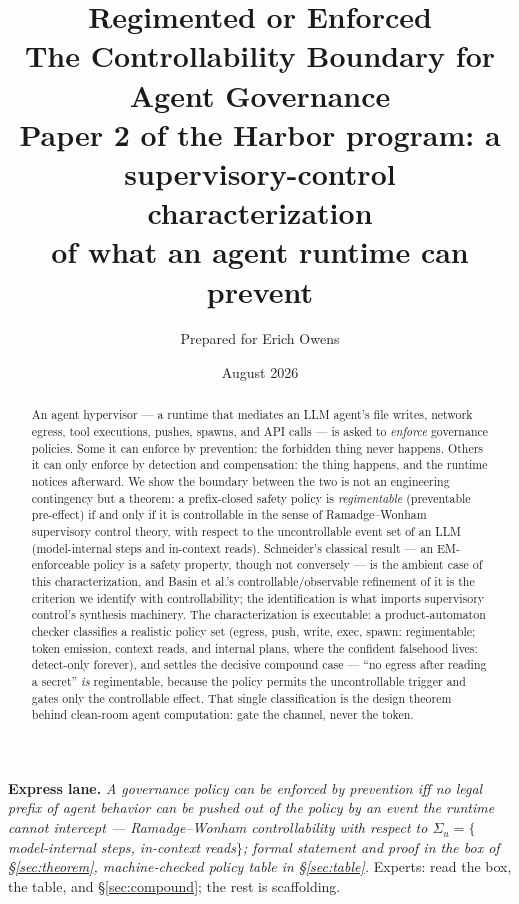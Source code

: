 \documentclass[11pt,a4paper]{article}  \usepackage{mdframed} \usepackage{graphicx}
\title{\textbf{Regimented or Enforced}\\[4pt] \large The Controllability Boundary for Agent Governance\\[3pt] \normalsize
Paper 2 of the Harbor program: a supervisory-control characterization\\ of what an agent runtime can prevent}
\author{Prepared for Erich Owens} \date{August 2026}
\begin{document}
 \maketitle

\begin{abstract} \noindent An agent hypervisor --- a runtime that mediates an LLM agent's file writes, network egress, tool
executions, pushes, spawns, and API calls --- is asked to \emph{enforce} governance policies. Some it can enforce by prevention: the
forbidden thing never happens. Others it can only enforce by detection and compensation: the thing happens, and the runtime
notices afterward. We show the boundary between the two is not an engineering contingency but a theorem: a prefix-closed
safety policy is \emph{regimentable} (preventable pre-effect) if and only if it is controllable in the sense of
Ramadge--Wonham supervisory control theory, with respect to the uncontrollable event set of an LLM (model-internal steps and
in-context reads). Schneider's classical result --- an EM-enforceable policy is a safety property, though not conversely ---
is the ambient case of this characterization, and Basin et al.'s controllable/observable refinement of it is the criterion we
identify with controllability; the identification is what imports supervisory control's synthesis machinery. The
characterization is executable: a product-automaton checker classifies a realistic policy set (egress, push, write, exec,
spawn: regimentable; token emission, context reads, and internal plans, where the confident falsehood lives: detect-only
forever), and settles the decisive compound case --- ``no egress after reading a secret'' \emph{is} regimentable, because the policy permits the
uncontrollable trigger and gates only the controllable effect. That single classification is the design theorem behind
clean-room agent computation: gate the channel, never the token. \end{abstract}

\vspace{0.5em} \noindent\textbf{Express lane.} \emph{A governance policy can be enforced by prevention iff no legal prefix of
agent behavior can be pushed out of the policy by an event the runtime cannot intercept --- Ramadge--Wonham controllability
with respect to $\Sigma_u = \{$model-internal steps, in-context reads$\}$; formal statement and proof in the box of
\S\ref{sec:theorem}, machine-checked policy table in \S\ref{sec:table}.} Experts: read the box, the table, and
\S\ref{sec:compound}; the rest is scaffolding.
\end{document}
